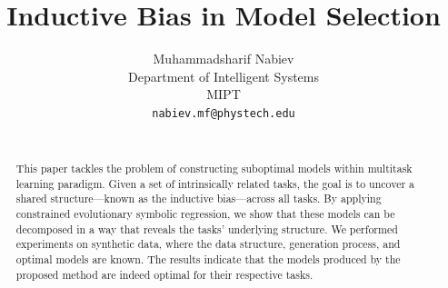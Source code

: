 \documentclass{article}
\title{Inductive Bias in Model Selection}
\author{
    Muhammadsharif Nabiev \\
    Department of Intelligent Systems\\
    MIPT\\
    \texttt{nabiev.mf@phystech.edu} \\
    \texttt{} \\
}
\date{}
\begin{document}
\maketitle

\begin{abstract}

This paper tackles the problem of constructing suboptimal models within multitask learning paradigm. Given a set of intrinsically related tasks, the goal is to uncover a shared structure—known as the inductive bias—across all tasks. By applying constrained evolutionary symbolic regression, we show that these models can be decomposed in a way that reveals the tasks' underlying structure. We performed experiments on synthetic data, where the data structure, generation process, and optimal models are known. The results indicate that the models produced by the proposed method are indeed optimal for their respective tasks.





\end{abstract}
\end{document}
